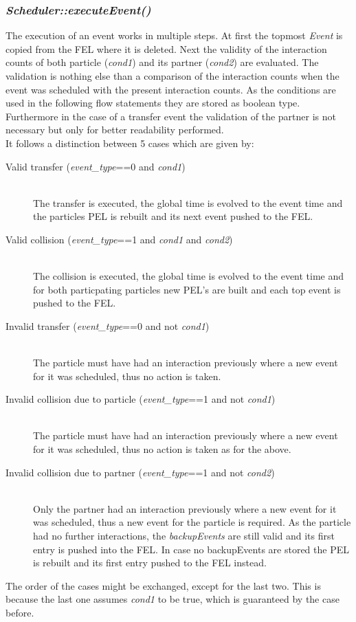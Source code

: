 \subsubsection{\quad \textit{Scheduler::executeEvent()}}
The execution of an event works in multiple steps. At first the topmost \textit{Event} is copied from the FEL where it is deleted. Next the validity of the interaction counts of both particle (\textit{cond1}) and its partner (\textit{cond2}) are evaluated. The validation is nothing else than a comparison of the interaction counts when the event was scheduled with the present interaction counts. As the conditions are used in the following flow statements they are stored as boolean type. Furthermore in the case of a transfer event the validation of the partner is not necessary but only for better readability performed.\\
It follows a distinction between 5 cases which are given by:
\begin{description}
\item[Valid transfer (\textit{event\_type}==0 and \textit{cond1}) ] \hfill \\ The transfer is executed, the global time is evolved to the event time and the particles PEL is rebuilt and its next event pushed to the FEL.
\item[Valid collision (\textit{event\_type}==1 and \textit{cond1} and \textit{cond2}) ]\hfill \\ The collision is executed, the global time is evolved to the event time and for both particpating particles new PEL's are built and each top event is pushed to the FEL.
\item[Invalid transfer (\textit{event\_type}==0 and not \textit{cond1})] \hfill \\ The particle must have had an interaction previously where a new event for it was scheduled, thus no action is taken.
\item[Invalid collision due to particle (\textit{event\_type}==1 and not \textit{cond1})] \hfill \\  The particle must have had an interaction previously where a new event for it was scheduled, thus no action is taken as for the above.
\item[Invalid collision due to partner (\textit{event\_type}==1 and not \textit{cond2})] \hfill \\  Only the partner had an interaction previously where a new event for it was scheduled, thus a new event for the particle is required. As the particle had no further interactions, the \textit{backupEvents} are still valid and its first entry is pushed into the FEL. In case no backupEvents are stored the PEL is rebuilt and its first entry pushed to the FEL instead.
\end{description}
The order of the cases might be exchanged, except for the last two. This is because the last one assumes \textit{cond1} to be true, which is guaranteed by the case before.\\

